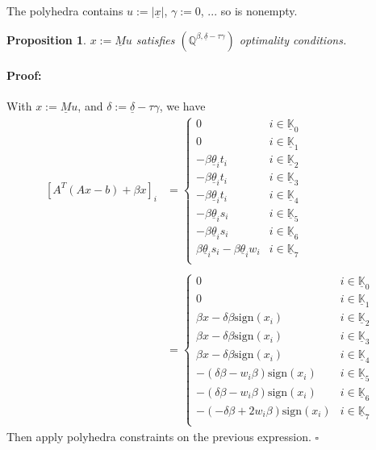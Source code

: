 \documentclass[fleqn]{report} %
\newtheorem{thm}{Proposition}[subsection]
\newenvironment{proof}{\paragraph{Proof:}}{\hfill$\square$}
\begin{document}
The polyhedra contains $u:=\left|\underline{x}\right|$, $\gamma:=0$, ... so is nonempty.
\begin{thm} $x:=\underline{M}u$ satisfies $(\mathbb{Q}^{\beta,\underline{\delta}-\tau\gamma})$ optimality conditions.
\end{thm}
\begin{proof} With $x:=\underline{M}u$, and $\delta:=\underline{\delta}-\tau\gamma$, we have 
\[
\begin{array}{ll}
\left[A^T(Ax -b)+\beta x\right]_i &= \left\{
\begin{array}{ll}
0&i\in\underline{\mathbb{K}}_0\\
0&i\in\underline{\mathbb{K}}_1\\
-\beta\underline{\theta}_it_i&i\in\underline{\mathbb{K}}_2\\
-\beta\underline{\theta}_it_i&i\in\underline{\mathbb{K}}_3\\
-\beta\underline{\theta}_it_i&i\in\underline{\mathbb{K}}_4\\
-\beta\underline{\theta}_is_i&i\in\underline{\mathbb{K}}_5\\
-\beta\underline{\theta}_is_i&i\in\underline{\mathbb{K}}_6\\
\beta\underline{\theta}_is_i-\beta\underline{\theta}_iw_i&i\in\underline{\mathbb{K}}_7\\
\end{array} 
\right.\\
&\\
& = \left\{
\begin{array}{lll}
0&i\in\underline{\mathbb{K}}_0\\
0&i\in\underline{\mathbb{K}}_1\\
\beta x - \delta\beta\text{sign}(x_i)&i\in\underline{\mathbb{K}}_2\\
\beta x - \delta\beta\text{sign}(x_i)&i\in\underline{\mathbb{K}}_3\\
\beta x - \delta\beta\text{sign}(x_i)&i\in\underline{\mathbb{K}}_4\\
-(\delta\beta - w_i\beta)\text{sign}(x_i)&i\in\underline{\mathbb{K}}_5\\
-(\delta\beta - w_i\beta)\text{sign}(x_i)&i\in\underline{\mathbb{K}}_6\\
-(-\delta\beta + 2w_i\beta)\text{sign}(x_i)&i\in\underline{\mathbb{K}}_7\\
\end{array} 
\right.
\end{array} 
\]
Then apply polyhedra constraints on the previous expression.
\end{proof}
\end{document}
